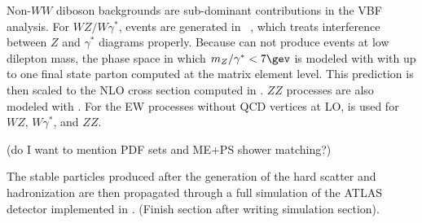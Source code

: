 Non-$WW$ diboson backgrounds are sub-dominant contributions in the VBF
analysis. For $WZ/W\gamma^{\ast}$, events are generated in \POWHEG~\cite{bib:Melia:2011tj},
which treats interference between $Z$ and $\gamma^{\ast}$ diagrams
properly. Because \POWHEG can not produce events at low dilepton mass,
the phase space in which $m_Z/\gamma^{\ast} < 7 \gev$ is
modeled with \SHERPA with up to one final state parton computed at the
matrix element level. This prediction is then scaled to the NLO cross
section computed in \MCFM. $ZZ$ processes are also modeled with
\POWHEG. For the EW processes without QCD vertices at LO, \SHERPA is
used for $WZ$, $W\gamma^{\ast}$, and $ZZ$. 

(do I want to mention PDF sets and ME+PS shower matching?)

The stable particles produced after the generation of the hard scatter
and hadronization are then propagated through a full simulation of the
ATLAS detector implemented in \GEANT. (Finish section after writing
simulation section). 





